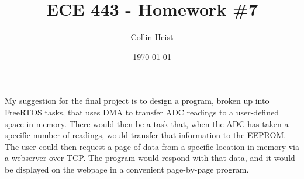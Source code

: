 \documentclass[a4paper, 12pt]{article}
\begin{document}
\title{ECE 443 - Homework \#7}
\author{Collin Heist}
\date{\today}
\maketitle


My suggestion for the final project is to design a program, broken up into FreeRTOS tasks, that uses DMA to transfer ADC readings to a user-defined space in memory. There would then be a task that, when the ADC has taken a specific number of readings, would transfer that information to the EEPROM. The user could then request a page of data from a specific location in memory via a webserver over TCP. The program would respond with that data, and it would be displayed on the webpage in a convenient page-by-page program.
\end{document}
